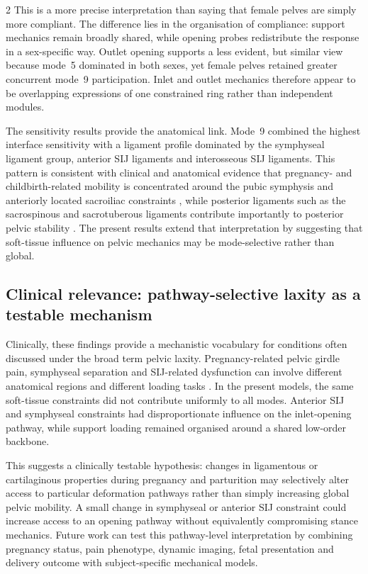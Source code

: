 \documentclass[openacc]{rsproca_new}
\begin{document}
\begin{multicols}{2}
This is a more precise interpretation than saying that female pelves are simply more compliant. The difference lies in the organisation of compliance: support mechanics remain broadly shared, while opening probes redistribute the response in a sex-specific way. Outlet opening supports a less evident, but similar view because mode~5 dominated in both sexes, yet female pelves retained greater concurrent mode~9 participation. Inlet and outlet mechanics therefore appear to be overlapping expressions of one constrained ring rather than independent modules.

The sensitivity results provide the anatomical link. Mode~9 combined the highest interface sensitivity with a ligament profile dominated by the symphyseal ligament group, anterior SIJ ligaments and interosseous SIJ ligaments. This pattern is consistent with clinical and anatomical evidence that pregnancy- and childbirth-related mobility is concentrated around the pubic symphysis and anteriorly located sacroiliac constraints \cite{Damen2001,Pires2015,Cicek2015,Fiani2021}, while posterior ligaments such as the sacrospinous and sacrotuberous ligaments contribute importantly to posterior pelvic stability \cite{Hammer2019,Aldabe2019}. The present results extend that interpretation by suggesting that soft-tissue influence on pelvic mechanics may be mode-selective rather than global.

\subsection{Clinical relevance: pathway-selective laxity as a testable mechanism}

Clinically, these findings provide a mechanistic vocabulary for conditions often discussed under the broad term pelvic laxity. Pregnancy-related pelvic girdle pain, symphyseal separation and SIJ-related dysfunction can involve different anatomical regions and different loading tasks \cite{Damen2001,Vleeming2012,Kiapour2019,Stolarczyk2021}. In the present models, the same soft-tissue constraints did not contribute uniformly to all modes. Anterior SIJ and symphyseal constraints had disproportionate influence on the inlet-opening pathway, while support loading remained organised around a shared low-order backbone.

This suggests a clinically testable hypothesis: changes in ligamentous or cartilaginous properties during pregnancy and parturition may selectively alter access to particular deformation pathways rather than simply increasing global pelvic mobility. A small change in symphyseal or anterior SIJ constraint could increase access to an opening pathway without equivalently compromising stance mechanics. Future work can test this pathway-level interpretation by combining pregnancy status, pain phenotype, dynamic imaging, fetal presentation and delivery outcome with subject-specific mechanical models.


\end{multicols}
\end{document}
